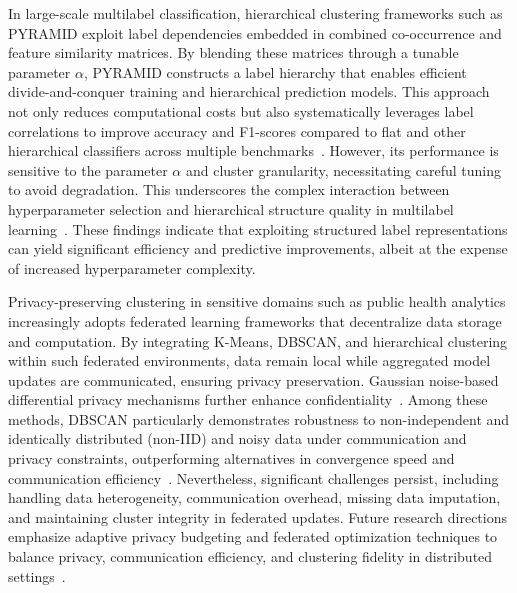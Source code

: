 \documentclass[sigconf]{acmart}
\begin{document}
In large-scale multilabel classification, hierarchical clustering frameworks such as PYRAMID exploit label dependencies embedded in combined co-occurrence and feature similarity matrices. By blending these matrices through a tunable parameter \(\alpha\), PYRAMID constructs a label hierarchy that enables efficient divide-and-conquer training and hierarchical prediction models. This approach not only reduces computational costs but also systematically leverages label correlations to improve accuracy and F1-scores compared to flat and other hierarchical classifiers across multiple benchmarks~\cite{ref17}. However, its performance is sensitive to the parameter \(\alpha\) and cluster granularity, necessitating careful tuning to avoid degradation. This underscores the complex interaction between hyperparameter selection and hierarchical structure quality in multilabel learning~\cite{ref17}. These findings indicate that exploiting structured label representations can yield significant efficiency and predictive improvements, albeit at the expense of increased hyperparameter complexity.

Privacy-preserving clustering in sensitive domains such as public health analytics increasingly adopts federated learning frameworks that decentralize data storage and computation. By integrating K-Means, DBSCAN, and hierarchical clustering within such federated environments, data remain local while aggregated model updates are communicated, ensuring privacy preservation. Gaussian noise-based differential privacy mechanisms further enhance confidentiality~\cite{ref22}. Among these methods, DBSCAN particularly demonstrates robustness to non-independent and identically distributed (non-IID) and noisy data under communication and privacy constraints, outperforming alternatives in convergence speed and communication efficiency~\cite{ref22}. Nevertheless, significant challenges persist, including handling data heterogeneity, communication overhead, missing data imputation, and maintaining cluster integrity in federated updates. Future research directions emphasize adaptive privacy budgeting and federated optimization techniques to balance privacy, communication efficiency, and clustering fidelity in distributed settings~\cite{ref22}.
\end{document}
